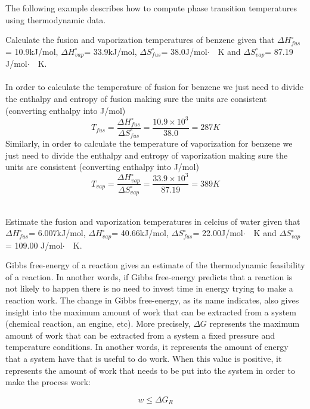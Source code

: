 \documentclass[main.tex]{subfiles}
\newcommand\chapterlabel{entropy}
\begin{document}
\begin{description}
\begin{center}
\begin{tabular}{llllll}
 \bottomrule
\end{tabular}\end{center}
The following example describes how to compute phase transition temperatures using thermodynamic data.

\begin{example} %
Calculate the fusion and vaporization temperatures of benzene given that $\Delta H^{\circ}_{fus}$= 10.9kJ/mol, $\Delta H^{\circ}_{vap}$= 33.9kJ/mol, $\Delta S^{\circ}_{fus}$= 38.0J/mol$\cdot\text{ }$ K and $\Delta S^{\circ}_{vap}$= 87.19 J/mol$\cdot\text{ }$ K. \\
\\
In order to calculate the temperature of fusion for benzene we just need to divide the enthalpy and entropy of fusion making sure the units are consistent (converting enthalpy into J/mol)
\[T_{fus}=\frac{\Delta H^{\circ}_{fus}}{\Delta S^{\circ}_{fus}} =\frac{10.9\times 10^3}{38.0}=287K	\]
Similarly, in order to calculate the temperature of vaporization for benzene we just need to divide the enthalpy and entropy of vaporization making sure the units are consistent (converting enthalpy into J/mol)
\[T_{vap}=\frac{\Delta H^{\circ}_{vap}}{\Delta S^{\circ}_{vap}} =\frac{33.9\times 10^3}{87.19}=389K	\]

\faDiamond\ \\
Estimate the fusion and vaporization temperatures in celcius of water given that $\Delta H^{\circ}_{fus}$= 6.007kJ/mol, $\Delta H^{\circ}_{vap}$= 40.66kJ/mol, $\Delta S^{\circ}_{fus}$=  22.00J/mol$\cdot\text{ }$ K and $\Delta S^{\circ}_{vap}$= 109.00 J/mol$\cdot\text{ }$ K.\\ 
\end{example}%

\item[\docfilehook{Gibbs free-energy and work}{ }] 
Gibbs free-energy of a reaction gives an estimate of the thermodynamic feasibility of a reaction. In another words, if Gibbs free-energy predicts that a reaction is not likely to happen there is no need to invest time in energy trying to make a reaction work. The change in Gibbs free-energy, as its name indicates, also gives insight into the maximum amount of work that can be extracted from a system (chemical reaction, an engine, etc). More precisely, $\Delta G$ represents the maximum amount of work that can be extracted from a system a fixed pressure and temperature conditions. In another words, it represents the amount of energy that a system have that is useful to do work. When this value is positive, it represents the amount of work that needs to be put into the system in order to make the process work:

\begin{equation}
\boxed{ w\leq \Delta G_R 	}\label{\chapterlabel:equation13}
\end{equation}
\end{description}
\end{document}
